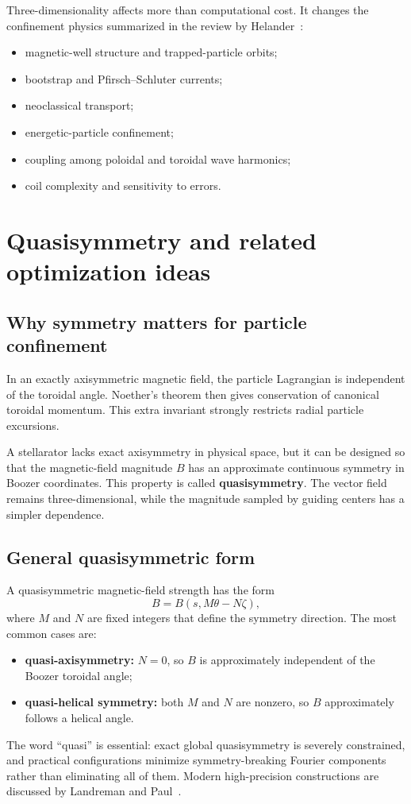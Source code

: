 Three-dimensionality affects more than computational cost. It changes the confinement physics summarized in the review by Helander~\cite{helander2014}:
\begin{itemize}[leftmargin=1.6em]
\item magnetic-well structure and trapped-particle orbits;
\item bootstrap and Pfirsch--Schluter currents;
\item neoclassical transport;
\item energetic-particle confinement;
\item coupling among poloidal and toroidal wave harmonics;
\item coil complexity and sensitivity to errors.
\end{itemize}

\section{Quasisymmetry and related optimization ideas}
\label{sec:quasisymmetry}

\subsection{Why symmetry matters for particle confinement}
In an exactly axisymmetric magnetic field, the particle Lagrangian is independent of the toroidal angle. Noether's theorem then gives conservation of canonical toroidal momentum. This extra invariant strongly restricts radial particle excursions.

A stellarator lacks exact axisymmetry in physical space, but it can be designed so that the magnetic-field magnitude $B$ has an approximate continuous symmetry in Boozer coordinates. This property is called \textbf{quasisymmetry}. The vector field remains three-dimensional, while the magnitude sampled by guiding centers has a simpler dependence.

\subsection{General quasisymmetric form}
A quasisymmetric magnetic-field strength has the form
\begin{equation}
B=B\left(s,M\theta-N\zeta\right),
\label{eq:quasisymmetry_form}
\end{equation}
where $M$ and $N$ are fixed integers that define the symmetry direction. The most common cases are:
\begin{itemize}[leftmargin=1.6em]
\item \textbf{quasi-axisymmetry:} $N=0$, so $B$ is approximately independent of the Boozer toroidal angle;
\item \textbf{quasi-helical symmetry:} both $M$ and $N$ are nonzero, so $B$ approximately follows a helical angle.
\end{itemize}
The word ``quasi'' is essential: exact global quasisymmetry is severely constrained, and practical configurations minimize symmetry-breaking Fourier components rather than eliminating all of them. Modern high-precision constructions are discussed by Landreman and Paul~\cite{landremanPaul2022}.

